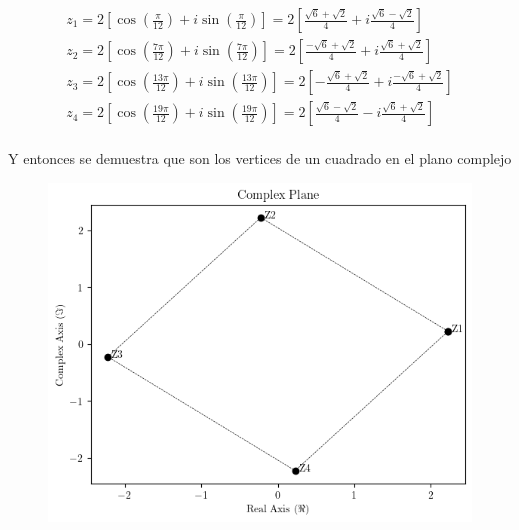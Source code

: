 \begin{gather*}
    z_1 = 2 \left[\cos\left(\frac{\pi}{12} \right) + i\sin\left(\frac{\pi}{12}\right)\right] = 2 \left[\frac{\sqrt{6} + \sqrt{2}}{4} + i \frac{\sqrt{6} - \sqrt{2}}{4} \right]\\
    z_2 = 2 \left[\cos\left(\frac{7\pi}{12} \right) + i\sin\left(\frac{7\pi}{12}\right)\right] = 2 \left[\frac{-\sqrt{6} + \sqrt{2}}{4} + i \frac{\sqrt{6} + \sqrt{2}}{4} \right]\\
    z_3 = 2 \left[\cos\left(\frac{13\pi}{12} \right) + i\sin\left(\frac{13\pi}{12}\right)\right]= 2 \left[-\frac{\sqrt{6} + \sqrt{2}}{4} + i \frac{-\sqrt{6} + \sqrt{2}}{4} \right]\\
    z_4 = 2 \left[\cos\left(\frac{19\pi}{12} \right) + i\sin\left(\frac{19\pi}{12}\right)\right] =  2 \left[\frac{\sqrt{6} - \sqrt{2}}{4} - i \frac{\sqrt{6} + \sqrt{2}}{4} \right]\\
\end{gather*}

Y entonces se demuestra que son los vertices de un cuadrado en el plano complejo 

\begin{figure}[h]
    \centering
    \includegraphics[scale = 1]{imgs/P1.png}
\end{figure}
